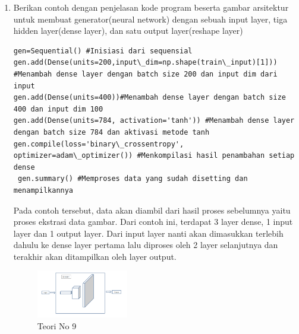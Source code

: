 \begin{enumerate}
            \item Berikan contoh dengan penjelasan kode program beserta gambar arsitektur untuk membuat generator(neural network) dengan sebuah input layer, tiga hidden layer(dense layer), dan satu output layer(reshape layer)
\begin{verbatim}
gen=Sequential() #Inisiasi dari sequensial
gen.add(Dense(units=200,input\_dim=np.shape(train\_input)[1])) #Menambah dense layer dengan batch size 200 dan input dim dari input
gen.add(Dense(units=400))#Menambah dense layer dengan batch size 400 dan input dim 100
gen.add(Dense(units=784, activation='tanh')) #Menambah dense layer dengan batch size 784 dan aktivasi metode tanh
gen.compile(loss='binary\_crossentropy', optimizer=adam\_optimizer()) #Menkompilasi hasil penambahan setiap dense
 gen.summary() #Memproses data yang sudah disetting dan menampilkannya
\end{verbatim}    
            \par Pada contoh tersebut, data akan diambil dari hasil proses sebelumnya yaitu proses ekstrasi data gambar. Dari contoh ini, terdapat 3 layer dense, 1 input layer dan 1 output layer. Dari input layer nanti akan dimasukkan terlebih dahulu ke dense layer pertama lalu diproses oleh 2 layer selanjutnya dan terakhir akan ditampilkan oleh layer output.
            \begin{figure}[H]
                \includegraphics[width=4cm]{figures/1174040/chapter8/teori9.png}
                \centering
                  \caption{Teori No 9}
            \end{figure}


\end{enumerate}
